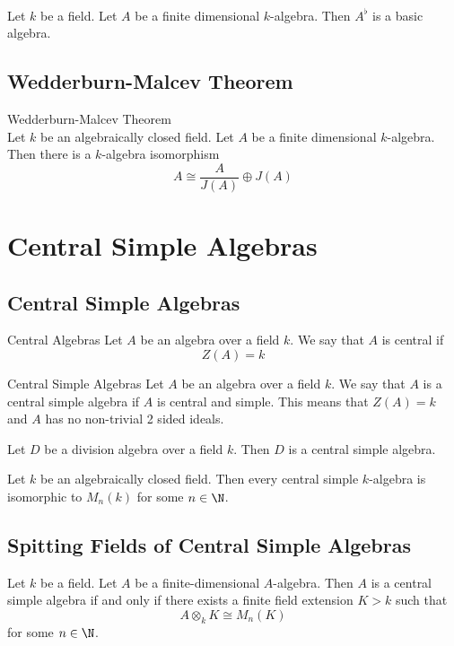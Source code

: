 \documentclass[a4paper]{article}
\begin{document}
\begin{lmm}{}{}\\
Let $k$ be a field. Let $A$ be a finite dimensional $k$-algebra. Then $A^\flat$ is a basic algebra. 
\end{lmm}

\subsection{Wedderburn-Malcev Theorem}
\begin{thm}{Wedderburn-Malcev Theorem}{}\\
Let $k$ be an algebraically closed field. Let $A$ be a finite dimensional $k$-algebra. Then there is a $k$-algebra isomorphism $$A\cong\frac{A}{J(A)}\oplus J(A)$$
\end{thm}

\pagebreak
\section{Central Simple Algebras}
\subsection{Central Simple Algebras}
\begin{defn}{Central Algebras}{} Let $A$ be an algebra over a field $k$. We say that $A$ is central if $$Z(A)=k$$
\end{defn}

\begin{defn}{Central Simple Algebras}{} Let $A$ be an algebra over a field $k$. We say that $A$ is a central simple algebra if $A$ is central and simple. This means that $Z(A)=k$ and $A$ has no non-trivial 2 sided ideals. 
\end{defn}

\begin{lmm}{}{} Let $D$ be a division algebra over a field $k$. Then $D$ is a central simple algebra. 
\end{lmm}

\begin{thm}{}{} Let $k$ be an algebraically closed field. Then every central simple $k$-algebra is isomorphic to $M_n(k)$ for some $n\in\N$. 
\end{thm}

\subsection{Spitting Fields of Central Simple Algebras}
\begin{thm}{}{} Let $k$ be a field. Let $A$ be a finite-dimensional $A$-algebra. Then $A$ is a central simple algebra if and only if there exists a finite field extension $K>k$ such that $$A\otimes_k K\cong M_n(K)$$ for some $n\in\N$. 
\end{thm}
\end{document}
